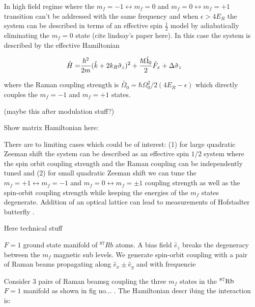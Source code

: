 In high field regime where the $m_f=-1\leftrightarrow m_f=0$ and $m_f=0 \leftrightarrow m_f=+1$ transition can't be addressed with the same frequency and when $\epsilon > 4E_R$ the system can be described in terms of an effective spin $\frac{1}{2}$ model by adiabatically eliminating the $m_f=0$ state (cite lindsay's paper here). In this case the system is described by the effective Hamiltonian 

\begin{align}
	\begin{split}
		\hat{H} = & \frac{\hbar^2}{2m}(\hat{k}+2{{k_R}}\hat{\sigma}_z)^2 + \frac{\hbar\tilde{\Omega_0}}{2}\hat{F}_x  +\Delta\hat{\sigma}_z  
	\label{Eq:SOChalf}
	\end{split}
\end{align}	
 
where the Raman coupling strength is $\tilde{\Omega_0}=\hbar\Omega_0^2/2(4E_R-\epsilon)$ which directly couples the $m_f=-1$ and $m_f=+1$ states. 

(maybe this after modulation stuff?)



Show matrix Hamiltonian here:

There are to limiting cases which could be of interest: (1) for large quadratic Zeeman shift the system can be described as an effective spin $1/2$ system where the spin orbit coupling strength and the Raman coupling can be independently tuned and (2) for small quadratic Zeeman shift we can tune the $m_f=+1\leftrightarrow m_f=-1$ and $m_f=0\leftrightarrow m_f=\pm 1$ coupling strength as well as the spin-orbit coupling strength while keeping the energies of the $m_f$ states degenerate. Addition of an optical lattice can lead to  measurements of Hofstadter butterfly  .  



Here technical stuff

$F=1$ ground state manifold of $^87Rb$ atoms. A bias field $\hat{e}_z$ breaks the degeneracy between the $m_f$ magnetic sub levels. We generate spin-orbit coupling with a pair of Raman beams propagating along $\hat{e}_x \pm \hat{e}_y$ and with frequencie



Consider 3 pairs of Raman beamsg coupling the three $m_f$ states in the $\Rb87$ $F=1$ manifold as shown in fig no... . The Hamiltonian descr ibing the interaction is: 

